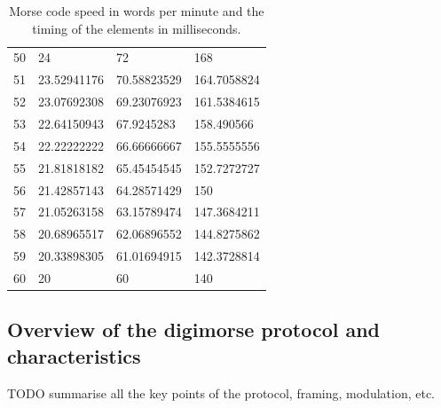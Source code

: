 \documentclass[a4paper]{tufte-handout}
\begin{document}
\begin{table}[!h]
\begin{tabular}{llll}
            50 & 24 & 72 & 168 \\
            51 & 23.52941176 & 70.58823529 & 164.7058824 \\
            52 & 23.07692308 & 69.23076923 & 161.5384615 \\
            53 & 22.64150943 & 67.9245283 & 158.490566 \\
            54 & 22.22222222 & 66.66666667 & 155.5555556 \\
            55 & 21.81818182 & 65.45454545 & 152.7272727 \\
            56 & 21.42857143 & 64.28571429 & 150 \\
            57 & 21.05263158 & 63.15789474 & 147.3684211 \\
            58 & 20.68965517 & 62.06896552 & 144.8275862 \\
            59 & 20.33898305 & 61.01694915 & 142.3728814 \\
            60 & 20 & 60 & 140 \\
            \bottomrule
        \end{tabular}
        \caption{Morse code speed in words per minute and the timing of the elements in milliseconds.}
        \label{tab:morsetab}
    \end{table}

\subsection{Overview of the digimorse protocol and characteristics}

TODO summarise all the key points of the protocol, framing, modulation, etc.

\pagebreak


\end{document}
